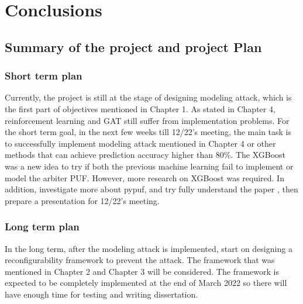 \chapter{Conclusions}

\section{Summary of the project and project Plan}

\subsection{Short term plan}
Currently, the project is still at the stage of designing modeling attack, which is the first part of objectives mentioned in Chapter 1. As stated in Chapter 4, reinforcement learning and GAT still suffer from implementation problems. For the short term goal, in the next few weeks till 12/22's meeting,
the main task is to successfully implement modeling attack mentioned in Chapter 4 or other methods that can achieve prediction accuracy higher than 80\%. The XGBoost was a new idea to try if both the previous machine learning fail to implement or model the arbiter PUF. 
However, more research on XGBoost was required. In addition, investigate more about pypuf, and try fully understand the paper \cite{Reference11}, then prepare a presentation for 12/22's meeting.

\subsection{Long term plan}
In the long term, after the modeling attack is implemented, start on designing a reconfigurability framework to prevent the attack. The framework that was mentioned in Chapter 2 and Chapter 3 will be considered. The framework
is expected to be completely implemented at the end of March 2022 so there will have enough time for testing and writing dissertation.
